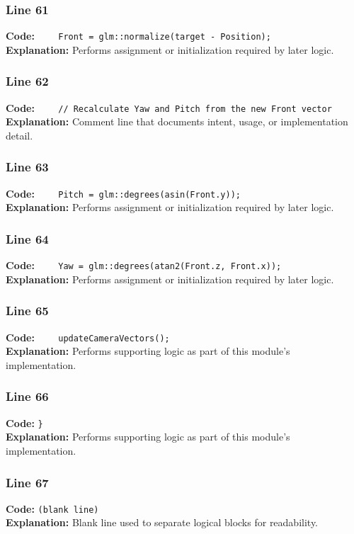 \documentclass[11pt,a4paper]{article}
\begin{document}
\subsubsection*{Line 61}
\textbf{Code:} \verb|    Front = glm::normalize(target - Position);|\\
\textbf{Explanation:} Performs assignment or initialization required by later logic.

\subsubsection*{Line 62}
\textbf{Code:} \verb|    // Recalculate Yaw and Pitch from the new Front vector|\\
\textbf{Explanation:} Comment line that documents intent, usage, or implementation detail.

\subsubsection*{Line 63}
\textbf{Code:} \verb|    Pitch = glm::degrees(asin(Front.y));|\\
\textbf{Explanation:} Performs assignment or initialization required by later logic.

\subsubsection*{Line 64}
\textbf{Code:} \verb|    Yaw = glm::degrees(atan2(Front.z, Front.x));|\\
\textbf{Explanation:} Performs assignment or initialization required by later logic.

\subsubsection*{Line 65}
\textbf{Code:} \verb|    updateCameraVectors();|\\
\textbf{Explanation:} Performs supporting logic as part of this module's implementation.

\subsubsection*{Line 66}
\textbf{Code:} \verb|}|\\
\textbf{Explanation:} Performs supporting logic as part of this module's implementation.

\subsubsection*{Line 67}
\textbf{Code:} \texttt{(blank line)}\\
\textbf{Explanation:} Blank line used to separate logical blocks for readability.
\end{document}

